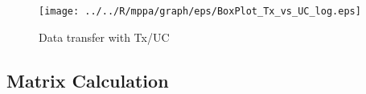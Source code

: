\documentclass[conference,compsoc]{IEEEtran}
\begin{document}
\begin{figure}[t]
  \centering
  \texttt{[image: ../../R/mppa/graph/eps/BoxPlot\_Tx\_vs\_UC\_log.eps]}
  \vspace{-5mm}
  \caption{\label{fig:tx_uc_log}
    Data transfer with Tx/UC }
  \vspace{-5mm}
\end{figure}

\vspace{-3mm}
\subsection{Matrix Calculation}
\label{sec:martix_eval}

\vspace{-3mm}
\end{document}
